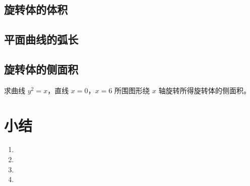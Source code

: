 \subsection{旋转体的体积}
\begin{Practice}
  \begin{question}
    \item 
    \item 
    \item 
  \end{question}
\end{Practice}

\subsection*{平面曲线的弧长}
\begin{Practice}
  \begin{question}
    \item 
    \item 
  \end{question}
\end{Practice}

\subsection*{旋转体的侧面积}
\begin{Practice}
  求曲线 $y^2=x$，直线 $x=0$，$x=6$ 所围图形绕 $x$ 轴旋转所得旋转体的侧面积。
\end{Practice}

\begin{Exercise}
  \begin{question}
    \item 
    \item 
    \item 
    \item 
    \item 
    \item 
    \item 
    \item 
  \end{question}
\end{Exercise}

\section*{小结}
\begin{enumerate}[C、,itemindent=4.5em]
  \item 
  \item 
  \item 
  \item 
\end{enumerate}

